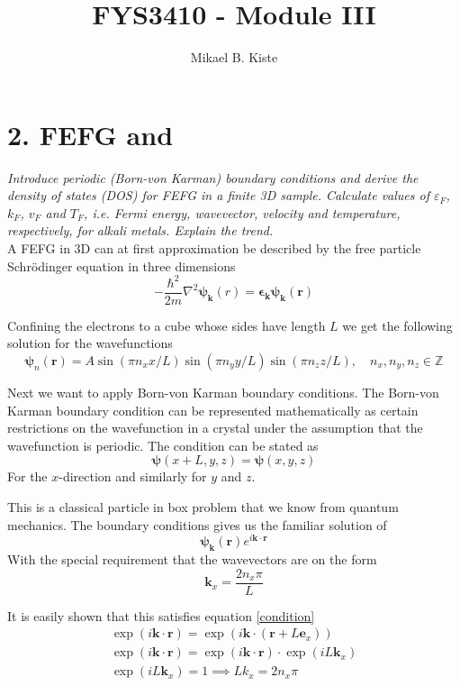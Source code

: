 \documentclass{article}
\author{Mikael B. Kiste}
\title{FYS3410 - Module III}
\begin{document}
\maketitle

\section*{2. FEFG and }
\emph{Introduce periodic (Born-von Karman) boundary conditions and derive the density of states (DOS) for FEFG in a finite 3D sample. Calculate values of $\varepsilon_F$, $k_F$, $v_F$ and $T_F$, i.e. Fermi energy, wavevector, velocity and temperature, respectively, for alkali metals. Explain the trend.}\\

A FEFG in 3D can at first approximation be described by the free particle Schrödinger equation in three dimensions
\begin{equation}
	-\frac{\hbar^2}{2m} \nabla^2 \bm{\psi_k}(r) = \bm{\epsilon_k}\bm{\psi_k}(\bm{r})
	\label{SE}
\end{equation}

Confining the electrons to a cube whose sides have length $L$ we get the following solution for the wavefunctions
\begin{equation}
	\bm{\psi}_n(\bm{r}) = A\sin(\pi n_xx/L)\sin(\pi n_yy/L)\sin(\pi n_zz/L), \quad n_x,n_y,n_z \in \mathbb{Z}
\end{equation}

Next we want to apply Born-von Karman boundary conditions. The Born-von Karman boundary condition can be represented mathematically as certain restrictions on the wavefunction in a crystal under the assumption that the wavefunction is periodic. The condition can be stated as
	\begin{equation}
		\bm{\psi}(x+L,y,z)=\bm{\psi}(x,y,z)
		\label{condition} 
	\end{equation}
For the $x$-direction and similarly for $y$ and $z$.

This is a classical particle in box problem that we know from quantum mechanics. The boundary conditions gives us the familiar solution of
\begin{equation}
	\bm{\psi_k}(\bm{r})e^{i\bm{k}\cdot\bm{r}}
	\label{pwave}
\end{equation}
With the special requirement that the wavevectors are on the form
$$ \bm{k}_x = \frac{2n_x\pi}{L} $$

It is easily shown that this satisfies equation \eqref{condition}
\begin{align*}
	\exp(i\bm{k}\cdot\bm{r}) = \exp(i\bm{k}\cdot(\bm{r}+L\bm{e}_x))\\
	\exp(i\bm{k}\cdot\bm{r}) = \exp(i\bm{k}\cdot\bm{r}) \cdot \exp(iL\bm k_x)\\
	\exp(iL\bm k_x) = 1 \implies Lk_x = 2n_x\pi
\end{align*}
\end{document}
